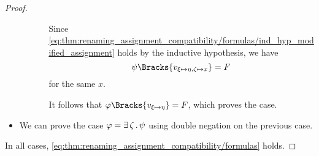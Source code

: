 \begin{proof}
\begin{itemize}
\begin{itemize}
\begin{itemize}
        Since \eqref{eq:thm:renaming_assignment_compatibility/formulas/ind_hyp_modified_assignment} holds by the inductive hypothesis, we have
        \begin{equation*}
          \psi\Bracks{v_{\xi \mapsto \eta, \zeta \mapsto x}} = F
        \end{equation*}
        for the same \( x \).

        It follows that \( \varphi\Bracks{v_{\xi \mapsto \eta}} = F \), which proves the case.
      \end{itemize}
    \end{itemize}

    \item We can prove the case \( \varphi = \exists \thinspace \zeta \thinspace . \thinspace \psi \) using double negation on the previous case.
  \end{itemize}

  In all cases, \eqref{eq:thm:renaming_assignment_compatibility/formulas} holds.
\end{proof}

